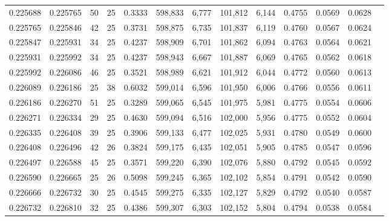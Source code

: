 \begin{tabular}{rrrrrrrrrrrrr}
0.225688 & 0.225765 &  50 &  25 &                                     0.3333 & 598,833 &   6,777 & 101,812 &   6,144 & 0.4755 & 0.0569 & 0.0628 \\
0.225765 & 0.225846 &  42 &  25 &                                     0.3731 & 598,875 &   6,735 & 101,837 &   6,119 & 0.4760 & 0.0567 & 0.0624 \\
0.225847 & 0.225931 &  34 &  25 &                                     0.4237 & 598,909 &   6,701 & 101,862 &   6,094 & 0.4763 & 0.0564 & 0.0621 \\
0.225931 & 0.225992 &  34 &  25 &                                     0.4237 & 598,943 &   6,667 & 101,887 &   6,069 & 0.4765 & 0.0562 & 0.0618 \\
0.225992 & 0.226086 &  46 &  25 &                                     0.3521 & 598,989 &   6,621 & 101,912 &   6,044 & 0.4772 & 0.0560 & 0.0613 \\
0.226089 & 0.226186 &  25 &  38 &                                     0.6032 & 599,014 &   6,596 & 101,950 &   6,006 & 0.4766 & 0.0556 & 0.0611 \\
0.226186 & 0.226270 &  51 &  25 &                                     0.3289 & 599,065 &   6,545 & 101,975 &   5,981 & 0.4775 & 0.0554 & 0.0606 \\
0.226271 & 0.226334 &  29 &  25 &                                     0.4630 & 599,094 &   6,516 & 102,000 &   5,956 & 0.4775 & 0.0552 & 0.0604 \\
0.226335 & 0.226408 &  39 &  25 &                                     0.3906 & 599,133 &   6,477 & 102,025 &   5,931 & 0.4780 & 0.0549 & 0.0600 \\
0.226408 & 0.226496 &  42 &  26 &                                     0.3824 & 599,175 &   6,435 & 102,051 &   5,905 & 0.4785 & 0.0547 & 0.0596 \\
0.226497 & 0.226588 &  45 &  25 &                                     0.3571 & 599,220 &   6,390 & 102,076 &   5,880 & 0.4792 & 0.0545 & 0.0592 \\
0.226590 & 0.226665 &  25 &  26 &                                     0.5098 & 599,245 &   6,365 & 102,102 &   5,854 & 0.4791 & 0.0542 & 0.0590 \\
0.226666 & 0.226732 &  30 &  25 &                                     0.4545 & 599,275 &   6,335 & 102,127 &   5,829 & 0.4792 & 0.0540 & 0.0587 \\
0.226732 & 0.226810 &  32 &  25 &                                     0.4386 & 599,307 &   6,303 & 102,152 &   5,804 & 0.4794 & 0.0538 & 0.0584 \\

\end{tabular}
